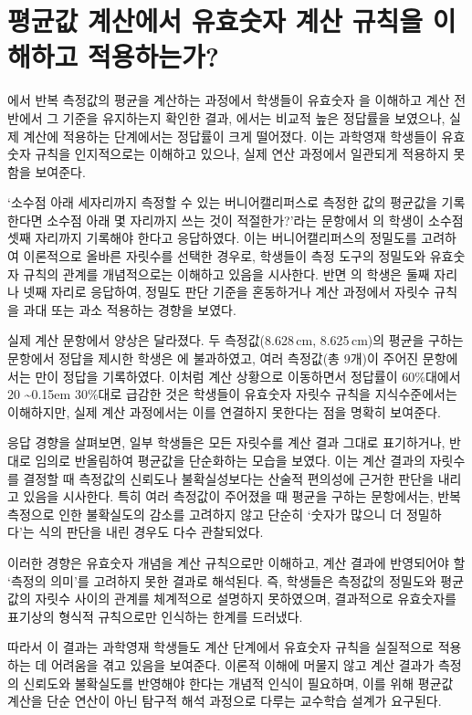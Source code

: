 \section{평균값 계산에서 유효숫자 계산 규칙을 이해하고 적용하는가?}

에서
반복 측정값의 평균을 계산하는 과정에서 학생들이 유효숫자 을
이해하고 계산 전반에서 그 기준을 유지하는지 확인한 결과,
%
에서는
비교적 높은 정답률을 보였으나, 실제 계산에 적용하는 단계에서는 정답률이 크게 떨어졌다.
%
이는 과학영재 학생들이 유효숫자 규칙을 인지적으로는 이해하고 있으나,
실제 연산 과정에서 일관되게 적용하지 못함을 보여준다.

\DigitChoiceForMean

`소수점 아래 세자리까지 측정할 수 있는 버니어캘리퍼스로 측정한 값의 평균값을 기록한다면
소수점 아래 몇 자리까지 쓰는 것이 적절한가?'라는 문항에서 의 학생이
소수점 셋째 자리까지 기록해야 한다고 응답하였다.
이는 버니어캘리퍼스의 정밀도를 고려하여 이론적으로 올바른 자릿수를 선택한 경우로,
학생들이 측정 도구의 정밀도와 유효숫자 규칙의 관계를
개념적으로는 이해하고 있음을 시사한다.
%
반면 의 학생은 둘째 자리나 넷째 자리로 응답하여,
정밀도 판단 기준을 혼동하거나 계산 과정에서 자릿수 규칙을 과대 또는
과소 적용하는 경향을 보였다.

\MeanCalculationAccuracy

실제 계산 문항에서 양상은 달라졌다.
두 측정값(8.628\,cm, 8.625\,cm)의 평균을 구하는 문항에서 정답을 제시한 학생은
에 불과하였고, 여러 측정값(총 9개)이 주어진 문항에서는
만이 정답을 기록하였다.
%
이처럼 계산 상황으로 이동하면서 정답률이 60\%대에서
20 \textasciitilde\kern0.15em 30\%대로 급감한 것은
학생들이 유효숫자 자릿수 규칙을 지식수준에서는 이해하지만,
실제 계산 과정에서는 이를 연결하지 못한다는 점을 명확히 보여준다.

응답 경향을 살펴보면, 일부 학생들은 모든 자릿수를 계산 결과 그대로 표기하거나,
반대로 임의로 반올림하여 평균값을 단순화하는 모습을 보였다.
%
이는 계산 결과의 자릿수를 결정할 때 측정값의 신뢰도나 불확실성보다는
산술적 편의성에 근거한 판단을 내리고 있음을 시사한다.
%
특히 여러 측정값이 주어졌을 때 평균을 구하는 문항에서는,
반복 측정으로 인한 불확실도의 감소를 고려하지 않고 단순히
`숫자가 많으니 더 정밀하다'는 식의 판단을 내린 경우도 다수 관찰되었다.

이러한 경향은 유효숫자 개념을 계산 규칙으로만 이해하고,
계산 결과에 반영되어야 할 `측정의 의미'를 고려하지 못한 결과로 해석된다.
즉, 학생들은 측정값의 정밀도와 평균값의 자릿수 사이의 관계를 체계적으로 설명하지 못하였으며,
결과적으로 유효숫자를 표기상의 형식적 규칙으로만 인식하는 한계를 드러냈다.

따라서 이 결과는 과학영재 학생들도 계산 단계에서 유효숫자 규칙을 실질적으로 적용하는 데
어려움을 겪고 있음을 보여준다.
이론적 이해에 머물지 않고 계산 결과가 측정의 신뢰도와 불확실도를 반영해야 한다는
개념적 인식이 필요하며, 이를 위해 평균값 계산을 단순 연산이 아닌
탐구적 해석 과정으로 다루는 교수학습 설계가 요구된다.